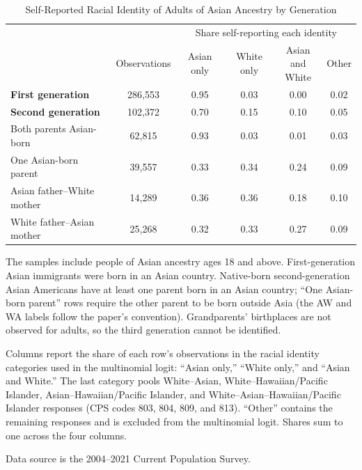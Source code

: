 \begin{table}[H]
\centering
\small{}
\caption{Self-Reported Racial Identity of Adults of Asian Ancestry by Generation \label{tab:asianbygen-adults}}
\begin{threeparttable}
\begin{tabular}{lccccc}
\toprule
 & & \multicolumn{4}{c}{Share self-reporting each identity} \\
\cmidrule(l{3pt}r{3pt}){3-6}
 & Observations & Asian only & White only & \specialcell{Asian and \\ White} & Other\\
\midrule
\textbf{First generation} & 286,553 & 0.95 & 0.03 & 0.00 & 0.02\\
\textbf{Second generation} & 102,372 & 0.70 & 0.15 & 0.10 & 0.05\\
\hspace{1em}Both parents Asian-born & 62,815 & 0.93 & 0.03 & 0.01 & 0.03\\
\hspace{1em}One Asian-born parent & 39,557 & 0.33 & 0.34 & 0.24 & 0.09\\
\hspace{1em}\hspace{1em}Asian father--White mother & 14,289 & 0.36 & 0.36 & 0.18 & 0.10\\
\hspace{1em}\hspace{1em}White father--Asian mother & 25,268 & 0.32 & 0.33 & 0.27 & 0.09\\
\bottomrule
\end{tabular}
\begin{tablenotes}
\small
\item[1] The samples include people of Asian ancestry ages 18 and above. First-generation Asian immigrants were born in an Asian country. Native-born second-generation Asian Americans have at least one parent born in an Asian country; ``One Asian-born parent'' rows require the other parent to be born outside Asia (the AW and WA labels follow the paper's convention). Grandparents' birthplaces are not observed for adults, so the third generation cannot be identified.
\item[2] Columns report the share of each row's observations in the racial identity categories used in the multinomial logit: ``Asian only,'' ``White only,'' and ``Asian and White.'' The last category pools White--Asian, White--Hawaiian/Pacific Islander, Asian--Hawaiian/Pacific Islander, and White--Asian--Hawaiian/Pacific Islander responses (CPS codes 803, 804, 809, and 813). ``Other'' contains the remaining responses and is excluded from the multinomial logit. Shares sum to one across the four columns.
\item[3] Data source is the 2004--2021 Current Population Survey.
\end{tablenotes}
\end{threeparttable}
\end{table}
